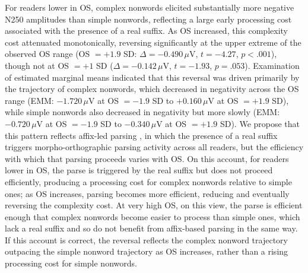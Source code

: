 \documentclass[utf8]{FrontiersinHarvard} %
\begin{document}
	For readers lower in OS, complex nonwords elicited substantially more negative N250 amplitudes than simple nonwords, reflecting a large early processing cost associated with the presence of a real suffix. As OS increased, this complexity cost attenuated monotonically, reversing significantly at the upper extreme of the observed OS range (OS $= +1.9$ SD: $\Delta = -0.490\,\mu$V, $t = -4.27$, $p < .001$), though not at OS $= +1$ SD ($\Delta = -0.142\,\mu$V, $t = -1.93$, $p = .053$). Examination of estimated marginal means indicated that this reversal was driven primarily by the trajectory of complex nonwords, which decreased in negativity across the OS range (EMM: $-1.720\,\mu$V at OS $= -1.9$ SD to $+0.160\,\mu$V at OS $= +1.9$ SD), while simple nonwords also decreased in negativity but more slowly (EMM: $-0.720\,\mu$V at OS $= -1.9$ SD to $-0.340\,\mu$V at OS $= +1.9$ SD). We propose that this pattern reflects affix-led parsing \citep{taft_lexical_1975, rastleMorphologicalDecompositionBased2008}, in which the presence of a real suffix triggers morpho-orthographic parsing activity across all readers, but the efficiency with which that parsing proceeds varies with OS. On this account, for readers lower in OS, the parse is triggered by the real suffix but does not proceed efficiently, producing a processing cost for complex nonwords relative to simple ones; as OS increases, parsing becomes more efficient, reducing and eventually reversing the complexity cost. At very high OS, on this view, the parse is efficient enough that complex nonwords become easier to process than simple ones, which lack a real suffix and so do not benefit from affix-based parsing in the same way. If this account is correct, the reversal reflects the complex nonword trajectory outpacing the simple nonword trajectory as OS increases, rather than a rising processing cost for simple nonwords.
	
\end{document}
